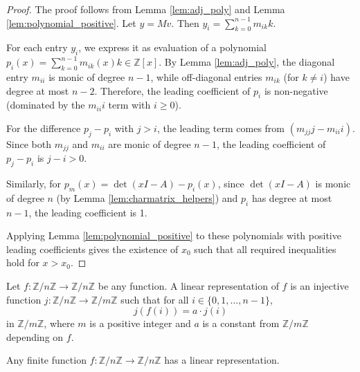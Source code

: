 \begin{proof}
The proof follows from Lemma \ref{lem:adj_poly} and Lemma \ref{lem:polynomial_positive}.
Let $y = Mv$. Then $y_i = \sum_{k=0}^{n-1} m_{ik} k$.

For each entry $y_i$, we express it as evaluation of a polynomial $p_i(x) = \sum_{k=0}^{n-1} m_{ik}(x) k \in \mathbb{Z}[x]$.
By Lemma \ref{lem:adj_poly}, the diagonal entry $m_{ii}$ is monic of degree $n-1$, while off-diagonal entries $m_{ik}$ (for $k \neq i$) have degree at most $n-2$.
Therefore, the leading coefficient of $p_i$ is non-negative (dominated by the $m_{ii} i$ term with $i \geq 0$).

For the difference $p_j - p_i$ with $j > i$, the leading term comes from $(m_{jj} j - m_{ii} i)$. Since both $m_{jj}$ and $m_{ii}$ are monic of degree $n-1$, the leading coefficient of $p_j - p_i$ is $j - i > 0$.

Similarly, for $p_m(x) = \det(x I - A) - p_i(x)$, since $\det(x I - A)$ is monic of degree $n$ (by Lemma \ref{lem:charmatrix_helpers}) and $p_i$ has degree at most $n-1$, the leading coefficient is 1.

Applying Lemma \ref{lem:polynomial_positive} to these polynomials with positive leading coefficients gives the existence of $x_0$ such that all required inequalities hold for $x > x_0$.
\end{proof}

\begin{definition}
\label{def:linear_representation}
\leanok
Let $f: \mathbb{Z}/n\mathbb{Z} \to \mathbb{Z}/n\mathbb{Z}$ be any function. A linear representation of $f$ is an injective function $j: \mathbb{Z}/n\mathbb{Z} \to \mathbb{Z}/m\mathbb{Z}$ 
such that for all $i\in \{0,1,\ldots,n-1\}$,
$$j(f(i)) = a \cdot j(i)$$
in $\mathbb{Z}/m\mathbb{Z}$, where $m$ is a positive integer and $a$ is a constant from $\mathbb{Z}/m\mathbb{Z}$ depending on $f$.
\end{definition}

\begin{theorem}
\label{thm:linear_representation}
\leanok
{}
Any finite function $f: \mathbb{Z}/n\mathbb{Z} \to \mathbb{Z}/n\mathbb{Z}$ has a linear representation.
\end{theorem}

